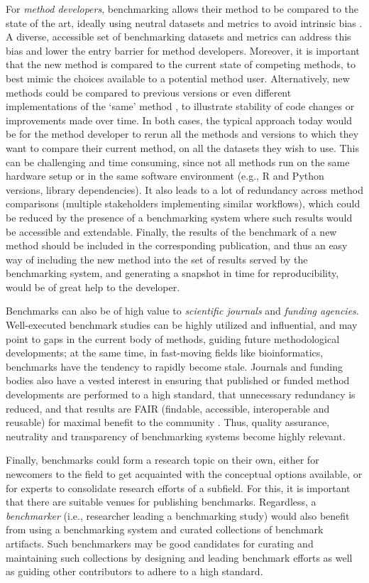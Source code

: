 \documentclass[11pt]{article}
\begin{document}
For \emph{method developers}, benchmarking allows their method to be compared to the state of the art, ideally using neutral datasets and metrics to avoid intrinsic bias \cite{Boulesteix2013-vy, Weber2019-el}. A diverse, accessible set of benchmarking datasets and metrics can address this bias and lower the entry barrier for method developers. Moreover, it is important that the new method is compared to the current state of competing methods, to best mimic the choices available to a potential method user. Alternatively, new methods could be compared to previous versions or even different implementations of the `same' method \cite{Rich2024-jh}, to illustrate stability of code changes or improvements made over time. In both cases, the typical approach today would be for the method developer to rerun all the methods and versions to which they want to compare their current method, on all the datasets they wish to use. This can be challenging and time consuming, since not all methods run on the same hardware setup or in the same software environment (e.g., R and Python versions, library dependencies). It also leads to a lot of redundancy across method comparisons (multiple stakeholders implementing similar workflows), which could be reduced by the presence of a benchmarking system where such results would be accessible and extendable. Finally, the results of the benchmark of a new method should be included in the corresponding publication, and thus an easy way of including the new method into the set of results served by the benchmarking system, and generating a snapshot in time for reproducibility, would be of great help to the developer. 

Benchmarks can also be of high value to \emph{scientific journals} and \emph{funding agencies}. Well-executed benchmark studies can be highly utilized and influential, and may point to gaps in the current body of methods, guiding future methodological developments; at the same time, in fast-moving fields like bioinformatics, benchmarks have the tendency to rapidly become stale. Journals and funding bodies also have a vested interest in ensuring that published or funded method developments are performed to a high standard, that unnecessary redundancy is reduced, and that results are FAIR (findable, accessible, interoperable and reusable) for maximal benefit to the community \cite{Wilkinson2016-bh}. Thus, quality assurance, neutrality and transparency of benchmarking systems become highly relevant. 

Finally, benchmarks could form a research topic on their own, either for newcomers to the field to get acquainted with the conceptual options available, or for experts to consolidate research efforts of a subfield. For this, it is important that there are suitable venues for publishing benchmarks. Regardless, a \emph{benchmarker} (i.e., researcher leading a benchmarking study) would also benefit from using a benchmarking system and curated collections of benchmark artifacts. Such benchmarkers may be good candidates for curating and maintaining such collections by designing and leading benchmark efforts as well as guiding other contributors to adhere to a high standard. 
\end{document}
